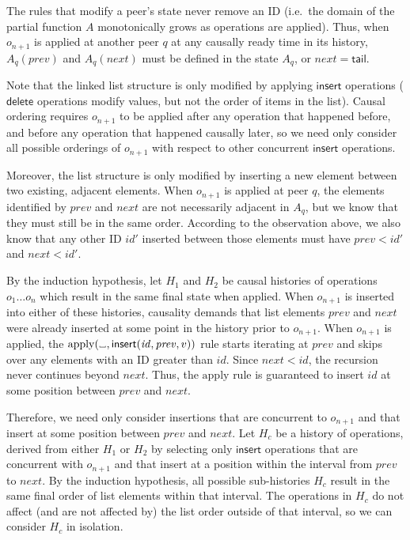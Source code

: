 \documentclass[a4paper,twocolumn,10pt]{article}
\newcommand{\placeholder}{%
  \makebox[0.7em]{%
    \kern.07em
    \vrule height.3ex
    \hrulefill
    \vrule height.3ex
    \kern.07em
  }%
}
\begin{document}
The rules that modify a peer's state never remove an ID (i.e.\ the domain of the partial function $A$ monotonically grows as operations are applied). Thus, when $o_{n+1}$ is applied at another peer $q$ at any causally ready time in its history, $A_q(\mathit{prev})$ and $A_q(\mathit{next})$ must be defined in the state $A_q$, or $\mathit{next} = \mathsf{tail}$.

Note that the linked list structure is only modified by applying $\mathsf{insert}$ operations ($\mathsf{delete}$ operations modify values, but not the order of items in the list). Causal ordering requires $o_{n+1}$ to be applied after any operation that happened before, and before any operation that happened causally later, so we need only consider all possible orderings of $o_{n+1}$ with respect to other concurrent $\mathsf{insert}$ operations.

Moreover, the list structure is only modified by inserting a new element between two existing, adjacent elements. When $o_{n+1}$ is applied at peer $q$, the elements identified by $\mathit{prev}$ and $\mathit{next}$ are not necessarily adjacent in $A_q$, but we know that they must still be in the same order. According to the observation above, we also know that any other ID $\mathit{id}'$ inserted between those elements must have $\mathit{prev} < \mathit{id}'$ and $\mathit{next} < \mathit{id}'$.

By the induction hypothesis, let $H_1$ and $H_2$ be causal histories of operations $o_1 \dots o_n$ which result in the same final state when applied. When $o_{n+1}$ is inserted into either of these histories, causality demands that list elements $\mathit{prev}$ and $\mathit{next}$ were already inserted at some point in the history prior to $o_{n+1}$. When $o_{n+1}$ is applied, the $\mathrm{apply}(\placeholder, \mathsf{insert}(\mathit{id}, \mathit{prev}, v))$ rule starts iterating at $\mathit{prev}$ and skips over any elements with an ID greater than $\mathit{id}$. Since $\mathit{next} < \mathit{id}$, the recursion never continues beyond $\mathit{next}$. Thus, the $\mathrm{apply}$ rule is guaranteed to insert $\mathit{id}$ at some position between $\mathit{prev}$ and $\mathit{next}$.

Therefore, we need only consider insertions that are concurrent to $o_{n+1}$ and that insert at some position between $\mathit{prev}$ and $\mathit{next}$. Let $H_c$ be a history of operations, derived from either $H_1$ or $H_2$ by selecting only $\mathsf{insert}$ operations that are concurrent with $o_{n+1}$ and that insert at a position within the interval from $\mathit{prev}$ to $\mathit{next}$. By the induction hypothesis, all possible sub-histories $H_c$ result in the same final order of list elements within that interval. The operations in $H_c$ do not affect (and are not affected by) the list order outside of that interval, so we can consider $H_c$ in isolation.
\end{document}
